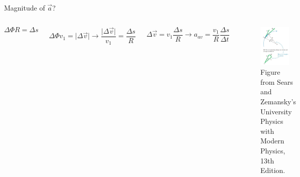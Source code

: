 \documentclass[]{beamer}
\begin{document}




\begin{frame}

    Magnitude of $\vec{a}$?
   
    \begin{columns}[c]
         \column{2.3in}  %
      
         
        

         \begin{equation*}
            \Delta \Phi R =\Delta s 
           \end{equation*}
           
         
            \begin{equation*}
            \Delta \Phi v_1 =\vert \Delta  \vec{v} \vert \rightarrow \frac{\vert\Delta \vec{v}\vert}{v_1} =\frac{\Delta s}{R}
           \end{equation*}
  
         \begin{equation*}
           \Delta \vec{v} =v_1\frac{\Delta s}{R}\rightarrow a_{av}=\frac{v_1}{R}\frac{\Delta s}{\Delta t}
           \end{equation*}
           
     
           
 
         \column{2.5in}
         
   
         \begin{figure}[h!]  
             \includegraphics[width=0.8\textwidth]{images/27.jpg}
             \caption{ {\tiny Figure from Sears and Zemansky's University Physics 
             with Modern Physics, 13th Edition.} }
           \end{figure}
           

\end{columns}
\end{frame}
\end{document}

